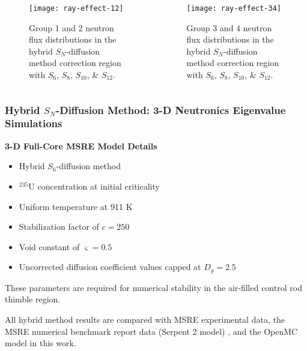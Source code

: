 \begin{frame}[noframenumbering]
  \begin{columns}
    \column{5.5cm}
    \begin{figure}[t]
      \small
      \centering
      \texttt{[image: ray-effect-12]}
      \caption{Group 1 and 2 neutron flux distributions in the hybrid $S_N$-diffusion method correction
      region with $S_6$, $S_8$, $S_{10}$, \& $S_{12}$.}
      \label{fig:ray-effect-12}
    \end{figure}
    \column{5.5cm}
    \begin{figure}[t]
      \small
      \centering
      \texttt{[image: ray-effect-34]}
      \caption{Group 3 and 4 neutron flux distributions in the hybrid $S_N$-diffusion method correction
      region with $S_6$, $S_8$, $S_{10}$, \& $S_{12}$.}
      \label{fig:ray-effect-34}
    \end{figure}
  \end{columns}
\end{frame}

\begin{frame}[noframenumbering]
  \frametitle{Hybrid $S_N$-Diffusion Method: 3-D Neutronics Eigenvalue Simulations}
  \textbf{3-D Full-Core MSRE Model Details}
  \begin{itemize}
    \item Hybrid $S_6$-diffusion method
    \item $^{235}$U concentration at initial criticality
    \item Uniform temperature at 911 K
    \item Stabilization factor of $c=250$
    \item Void constant of $\varsigma=0.5$
    \item Uncorrected diffusion coefficient values capped at $D_g = 2.5$
  \end{itemize}
  \vspace{.2cm}

  These parameters are required for numerical stability in the air-filled control rod
  thimble region.
  \vspace{.2cm}

  All hybrid method results are compared with MSRE experimental data, the MSRE numerical benchmark
  report data (Serpent 2 model) \cite{fratoni_molten_2020}, and the OpenMC model in this work.
\end{frame}

